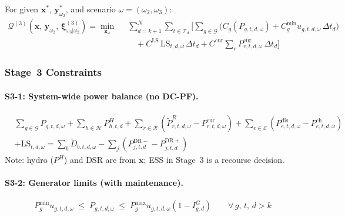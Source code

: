 \documentclass[11pt]{article}
\newcommand{\Pch}{P^{\mathrm{ch}}}
\newcommand{\Pdis}{P^{\mathrm{dis}}}
\newcommand{\LS}{\mathrm{LS}}
\begin{document}
For given $\mathbf{x}^*$, $\mathbf{y}^*_{\omega_2}$, and scenario
$\omega = (\omega_2, \omega_3)$:
\begin{equation}\label{eq:Q3-def}
\boxed{
\begin{aligned}
  \mathcal{Q}^{(3)}(\mathbf{x},\,\mathbf{y}_{\omega_2},\,
    \boldsymbol{\xi}^{(3)}_{\omega_3|\omega_2})
  = \min_{\mathbf{z}_\omega}\;\;
  & \sum_{d=k+1}^{N}\sum_{t \in \mathcal{T}_d}\Biggl[
    \sum_{g \in \mathcal{G}}
    \bigl(C_g(P_{g,t,d,\omega})
    + C^{\min}_g u_{g,t,d,\omega}\,\Delta t_d\bigr) \\
  &\quad
    + C^{\mathrm{LS}}\,\LS_{t,d,\omega}\,\Delta t_d
    + C^{\mathrm{cur}} \sum_{r}
      P^{\mathrm{cur}}_{r,t,d,\omega}\,\Delta t_d
  \Biggr]
\end{aligned}
}
\end{equation}

\subsubsection{Stage~3 Constraints}

\paragraph{S3-1: System-wide power balance (no DC-PF).}
\begin{equation}\label{eq:s3-balance}
\begin{aligned}
  & \sum_{g \in \mathcal{G}} P_{g,t,d,\omega}
  + \sum_{h \in \mathcal{H}} P^{H}_{h,t,d}
  + \sum_{r \in \mathcal{R}}
    (\tilde{P}^{R}_{r,t,d,\omega} - P^{\mathrm{cur}}_{r,t,d,\omega})
  + \sum_{e \in \mathcal{E}}
    (\Pdis_{e,t,d,\omega} - \Pch_{e,t,d,\omega}) \\
  &+ \LS_{t,d,\omega}
  = \sum_{b} \tilde{D}_{b,t,d,\omega}
  - \sum_{j}(P^{\mathrm{DR-}}_{j,t,d} - P^{\mathrm{DR+}}_{j,t,d})
\end{aligned}
\end{equation}
Note: hydro ($P^H$) and DSR are from $\mathbf{x}$; ESS in Stage~3
is a recourse decision.

\paragraph{S3-2: Generator limits (with maintenance).}
\begin{equation}\label{eq:s3-gen-lim}
  P^{\min}_g u_{g,t,d,\omega}
  \;\leq\; P_{g,t,d,\omega} \;\leq\;
  P^{\max}_g u_{g,t,d,\omega} (1 - I^{G}_{g,d})
  \qquad \forall\, g,\,t,\,d > k
\end{equation}
\end{document}
